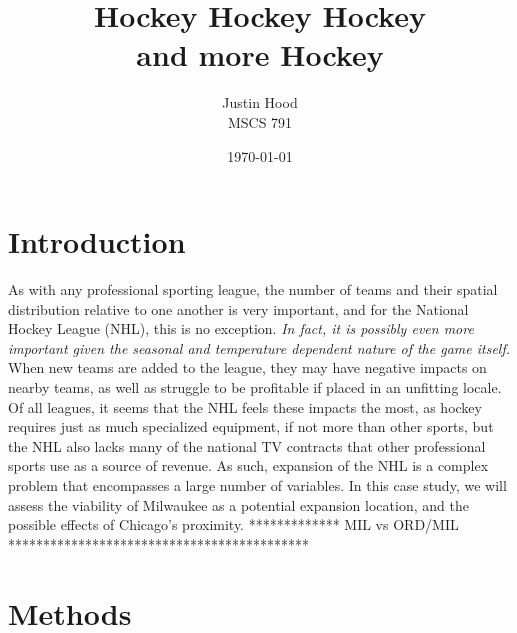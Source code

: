 \documentclass[11pt]{report}            %
\title{\bf Hockey Hockey Hockey\\
\large and more Hockey}  %
\author{Justin Hood\\
MSCS 791}              %
\date{\today}                           %
\begin{document}
\maketitle                              %
\setcounter{page}{2}                    %
\tableofcontents                        %
\newpage
\section*{Introduction}                %
As with any professional sporting league, the number of teams and their spatial distribution relative to one another is very important, and for the National Hockey League (NHL), this is no exception. \textit{In fact, it is possibly even more important given the seasonal and temperature dependent nature of the game itself.} When new teams are added to the league, they may have negative impacts on nearby teams, as well as struggle to be profitable if placed in an unfitting locale. Of all leagues, it seems that the NHL feels these impacts the most, as hockey requires just as much specialized equipment, if not more than other sports, but the NHL also lacks many of the national TV contracts that other professional sports use as a source of revenue\cite{light}. As such, expansion of the NHL is a complex problem that encompasses a large number of variables. In this case study, we will assess the viability of Milwaukee as a potential expansion location, and the possible effects of Chicago's proximity.
************* MIL vs ORD/MIL *******************************************
\section*{Methods}
\end{document}
